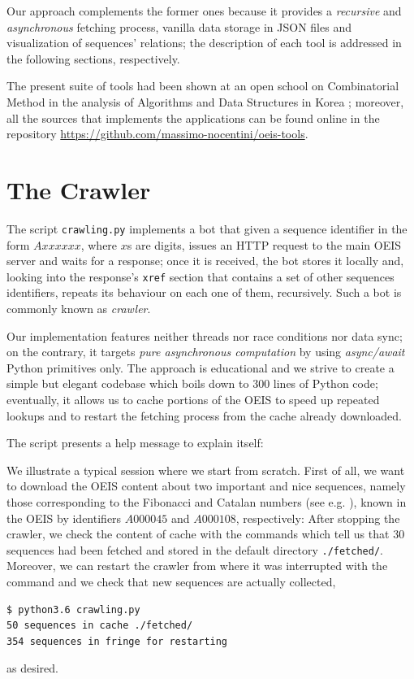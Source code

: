 Our approach complements the former ones because it provides a
\textit{recursive} and \textit{asynchronous} fetching process, vanilla data
storage in JSON files and visualization of sequences' relations; the
description of each tool is addressed in the following sections, respectively.

The present suite of tools had been shown at an open school on
Combinatorial Method in the analysis of Algorithms and Data Structures
in Korea \citep{Nocentini:korea}; moreover, all the sources that
implements the applications can be found online in the repository
\url{https://github.com/massimo-nocentini/oeis-tools}.

\section{The Crawler}

The script \verb|crawling.py| implements a bot that given a sequence identifier
in the form $Axxxxxx$, where $x$s are digits, issues an HTTP request to the
main OEIS server and waits for a response; once it is received, the bot stores
it locally and, looking into the response's \verb|xref| section that contains a
set of other sequences identifiers, repeats its behaviour on each one of them,
recursively.  Such a bot is commonly known as \emph{crawler}.

Our implementation features neither threads nor race conditions nor data sync;
on the contrary, it targets \textit{pure asynchronous computation} by using
\textit{async/await} Python primitives only. The approach is educational and we
strive to create a simple but elegant codebase which boils down to $300$ lines
of Python code; eventually, it allows us to cache portions of the OEIS to speed
up repeated lookups and to restart the fetching process from the cache already
downloaded.

The script presents a help message to explain itself:

\begin{example}
We illustrate a typical session where we start from scratch. First of all, we
want to download the OEIS content about two important and nice sequences,
namely those corresponding to the Fibonacci and Catalan numbers (see e.g.
\citep{ConcreteMath,stanley:2015}), known in the OEIS by identifiers $A000045$ and
$A000108$, respectively:
After stopping the crawler, we check the content of cache with the commands
 which tell us that
$30$ sequences had been fetched and stored in the default directory
\verb|./fetched/|.  Moreover, we can restart the crawler from where it was
interrupted with the command
and we check that new sequences are actually collected,
\begin{Verbatim}[fontsize=\small]
$ python3.6 crawling.py
50 sequences in cache ./fetched/
354 sequences in fringe for restarting
\end{Verbatim}
as desired.
\end{example}

